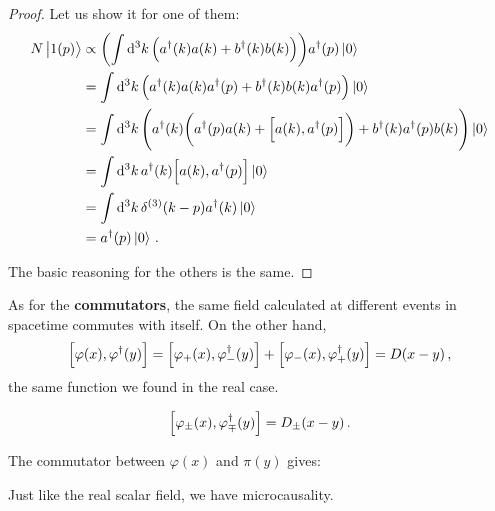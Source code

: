 \documentclass[main.tex]{subfiles}
\begin{document}
\begin{proof}
Let us show it for one of them: 
%
\begin{subequations}
\begin{align}
N \ket{1 (p)} &\propto
\qty(\int \dd[3]{k} \qty(a ^\dag(k) a(k) + b ^\dag(k) b (k))) 
a ^\dag (p) \ket{0}  \\
&= \int \dd[3]{k} \qty( a ^\dag (k) a (k) a ^\dag(p) + b ^\dag(k) b(k) a ^\dag (p)) \ket{0}  \\
&= \int \dd[3]{k} \qty( a ^\dag (k) \qty( a ^\dag(p) a (k) + \qty[a(k), a ^\dag(p)]) + b ^\dag(k) a ^\dag (p) b(k)) \ket{0}  \\
&= \int \dd[3]{k} a ^\dag (k) \qty[a(k), a ^\dag(p) ]  \ket{0}   \\
&= \int \dd[3]{k} \delta^{(3)} (k-p) a ^\dag(k) \ket{0} \\
&= a ^\dag(p) \ket{0}
\,.
\end{align}
\end{subequations}

The basic reasoning for the others is the same. 
\end{proof}

As for the \textbf{commutators}, the same field calculated at different events in spacetime commutes with itself. On the other hand, 
%
\begin{align}
\qty[ \varphi (x), \varphi ^\dag(y)]
= \qty[\varphi_{+} (x), \varphi ^\dag_{-} (y)]
+ \qty[\varphi_{-} (x), \varphi ^\dag_{+} (y)]
= D(x-y)
\,,
\end{align}
%
the same function we found in the real case. 

\begin{claim}
\begin{align}
\qty[\varphi_{\pm} (x), \varphi ^\dag_{\mp}(y)] = D_{\pm} (x-y)
\,.
\end{align}
\end{claim}

\begin{claim}
The commutator between \(\varphi (x)\) and \(\pi (y)\) gives: 
\end{claim}

Just like the real scalar field, we have microcausality. 
\end{document}
